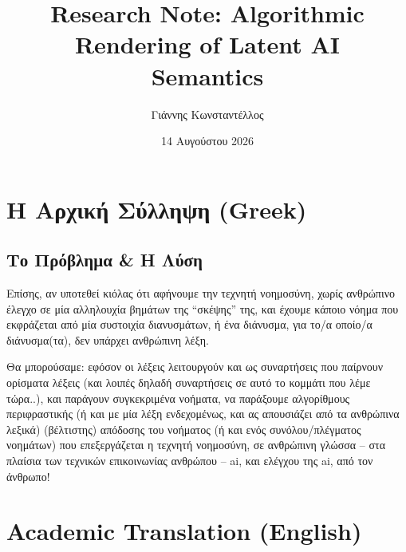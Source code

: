 \documentclass[11pt,a4paper]{article}
\title{\textbf{Research Note: Algorithmic Rendering of Latent AI\\Semantics}}
\author{Γιάννης Κωνσταντέλλος}
\date{14 Αυγούστου 2026}
\begin{document}
\maketitle

\section*{Η Αρχική Σύλληψη (Greek)}

\begin{propositionbox}
\subsection*{Το Πρόβλημα \& Η Λύση}

Επίσης, αν υποτεθεί κιόλας ότι αφήνουμε την τεχνητή νοημοσύνη, χωρίς ανθρώπινο έλεγχο σε μία αλληλουχία βημάτων της ``σκέψης'' της, και έχουμε κάποιο νόημα που εκφράζεται από μία συστοιχία διανυσμάτων, ή ένα διάνυσμα, για το/α οποίο/α διάνυσμα(τα), δεν υπάρχει ανθρώπινη λέξη.

Θα μπορούσαμε: εφόσον οι λέξεις λειτουργούν και ως συναρτήσεις που παίρνουν ορίσματα λέξεις (και λοιπές δηλαδή συναρτήσεις σε αυτό το κομμάτι που λέμε τώρα..), και παράγουν συγκεκριμένα νοήματα, να παράξουμε αλγορίθμους περιφραστικής (ή και με μία λέξη ενδεχομένως, και ας απουσιάζει από τα ανθρώπινα λεξικά) (βέλτιστης) απόδοσης του νοήματος (ή και ενός συνόλου/πλέγματος νοημάτων) που επεξεργάζεται η τεχνητή νοημοσύνη, σε ανθρώπινη γλώσσα -- στα πλαίσια των τεχνικών επικοινωνίας ανθρώπου -- ai, και ελέγχου της ai, από τον άνθρωπο!
\end{propositionbox}

\newpage

\section*{Academic Translation (English)}
\end{document}
